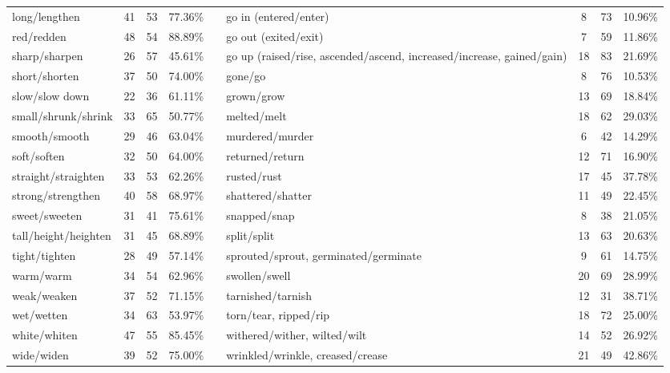 \begin{tabular}{p{3cm}ccccp{3cm}ccc}
long/lengthen & 41 & 53 & 77.36\% & & go in (entered/enter) & 8 & 73 & 10.96\% \\
red/redden & 48 & 54 & 88.89\% & & go out (exited/exit) & 7 & 59 & 11.86\% \\
sharp/sharpen & 26 & 57 & 45.61\% & & go up (raised/rise, ascended/ascend, increased/increase, gained/gain) & 18 & 83 & 21.69\% \\
short/shorten & 37 & 50 & 74.00\% & & gone/go & 8 & 76 & 10.53\% \\
slow/slow down & 22 & 36 & 61.11\% & & grown/grow & 13 & 69 & 18.84\% \\
small/shrunk/shrink & 33 & 65 & 50.77\% & & melted/melt & 18 & 62 & 29.03\% \\
smooth/smooth & 29 & 46 & 63.04\% & & murdered/murder & 6 & 42 & 14.29\% \\
soft/soften & 32 & 50 & 64.00\% & & returned/return & 12 & 71 & 16.90\% \\
straight/straighten & 33 & 53 & 62.26\% & & rusted/rust & 17 & 45 & 37.78\% \\
strong/strengthen & 40 & 58 & 68.97\% & & shattered/shatter & 11 & 49 & 22.45\% \\
sweet/sweeten & 31 & 41 & 75.61\% & & snapped/snap & 8 & 38 & 21.05\% \\
tall/height/heighten & 31 & 45 & 68.89\% & & split/split & 13 & 63 & 20.63\% \\
tight/tighten & 28 & 49 & 57.14\% & & sprouted/sprout, germinated/germinate & 9 & 61 & 14.75\% \\
warm/warm & 34 & 54 & 62.96\% & & swollen/swell & 20 & 69 & 28.99\% \\
weak/weaken & 37 & 52 & 71.15\% & & tarnished/tarnish & 12 & 31 & 38.71\% \\
wet/wetten & 34 & 63 & 53.97\% & & torn/tear, ripped/rip & 18 & 72 & 25.00\% \\
white/whiten & 47 & 55 & 85.45\% & & withered/wither, wilted/wilt & 14 & 52 & 26.92\% \\
wide/widen & 39 & 52 & 75.00\% & & wrinkled/wrinkle, creased/crease & 21 & 49 & 42.86\%
\end{tabular}